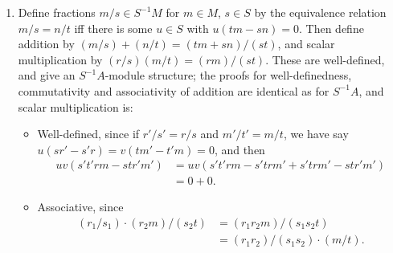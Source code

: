 \documentclass{report}
\begin{document}
\begin{enumerate}[label=\textbf{1.3.\Alph*.}]
	\item Define fractions $m/s\in S^{-1}M$ for $m\in M$, $s\in S$ by the
	      equivalence relation $m/s=n/t$ iff there is some $u\in S$ with
	      $u(tm-sn)=0$. Then define addition by $(m/s)+(n/t)=(tm+sn)/(st)$,
	      and scalar multiplication by $(r/s)(m/t)=(rm)/(st)$. These are
	      well-defined, and give an $S^{-1}A$-module structure; the proofs for
	      well-definedness, commutativity and associativity of addition are
	      identical as for $S^{-1}A$, and scalar multiplication is:
	      \begin{itemize}
		      \item Well-defined, since if $r'/s'=r/s$ and $m'/t'=m/t$, we have
		            say $u(sr'-s'r)=v(tm'-t'm)=0$, and then
		            \begin{align*}
			            uv(s't'rm - str'm')
			             & = uv(s't'rm - s'trm' + s'trm' - str'm') \\
			             & = 0 + 0.
		            \end{align*}

		      \item Associative, since
		            \begin{align*}
			            (r_1/s_1)\cdot(r_2m)/(s_2t)
			             & = (r_1r_2m)/(s_1s_2t)          \\
			             & = (r_1r_2)/(s_1s_2)\cdot(m/t).
		            \end{align*}


\end{itemize}
\end{enumerate}
\end{document}
